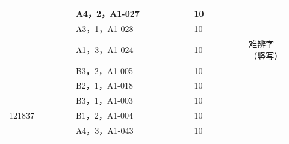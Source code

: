 \documentclass[UTF8,10pt,a4paper,fontset=fandol]{ctexart}
\newcommand{\fieldvalue}[1]{#1}
\newcommand{\handwritten}[1]{#1}
\begin{document}
\begin{center}
\begin{tabular}{|p{0.22\linewidth}|p{0.39\linewidth}|p{0.18\linewidth}|p{0.13\linewidth}|}
\hline
&
\fieldvalue{\handwritten{A4，2，A1-027}} &
\fieldvalue{\handwritten{10}} &\\
\hline
&
\fieldvalue{\handwritten{A3，1，A1-028}} &
\fieldvalue{\handwritten{10}} &\\
\hline
&
\fieldvalue{\handwritten{A1，3，A1-024}} &
\fieldvalue{\handwritten{10}} &
\fieldvalue{\handwritten{难辨字（竖写）}}\\
\hline
&
\fieldvalue{\handwritten{B3，2，A1-005}} &
\fieldvalue{\handwritten{10}} &\\
\hline
&
\fieldvalue{\handwritten{B2，1，A1-018}} &
\fieldvalue{\handwritten{10}} &\\
\hline
&
\fieldvalue{\handwritten{B3，1，A1-003}} &
\fieldvalue{\handwritten{10}} &\\
\hline
\fieldvalue{\handwritten{121837}} &
\fieldvalue{\handwritten{B1，2，A1-004}} &
\fieldvalue{\handwritten{10}} &\\
\hline
&
\fieldvalue{\handwritten{A4，3，A1-043}} &
\fieldvalue{\handwritten{10}} &\\

\end{tabular}
\end{center}
\end{document}
